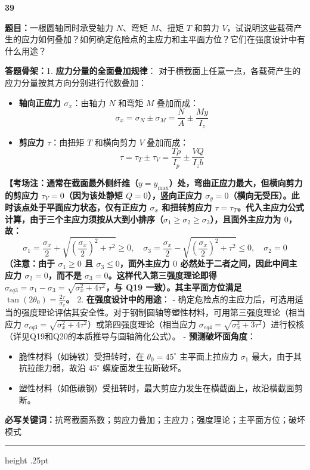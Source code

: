 \documentclass[a4paper,10pt]{article}
\newcommand{\qitem}[5]{%
\Needspace{6\baselineskip}
\vspace{3pt}
{\Large\bfseries\color{deep} #1}\quad{\bfseries\color{orangea}#2}\par
\textbf{题目：}#3\par
\textbf{答题骨架：}#4\par
\textbf{必写关键词：}{\color{bluea}#5}\par
\vspace{2pt}\hrule height .25pt
}
\newcommand{\warn}[1]{{\bfseries\color{reda}#1}}
\begin{document}
\qitem{39}{弯扭组合圆轴与多向应力叠加}
{一根圆轴同时承受轴力 \(N\)、弯矩 \(M\)、扭矩 \(T\) 和剪力 \(V\)，试说明这些载荷产生的应力如何叠加？如何确定危险点的主应力和主平面方位？它们在强度设计中有什么用途？}
{1. \textbf{应力分量的全面叠加规律}：
   对于横截面上任意一点，各载荷产生的应力分量按其方向分别进行代数叠加：
   \begin{itemize}
     \item \textbf{轴向正应力 \(\sigma_x\)}：由轴力 \(N\) 和弯矩 \(M\) 叠加而成：
           \[ \sigma_x = \sigma_N \pm \sigma_M = \frac{N}{A} \pm \frac{M y}{I_z} \]
     \item \textbf{剪应力 \(\tau\)}：由扭矩 \(T\) 和横向剪力 \(V\) 叠加而成：
           \[ \tau = \tau_T \pm \tau_V = \frac{T \rho}{I_p} \pm \frac{V Q}{I_z b} \]
   \end{itemize}
   \warn{【考场注：通常在截面最外侧纤维（\(y = y_{\max}\)）处，弯曲正应力最大，但横向剪力的剪应力 \(\tau_V = 0\)（因为该处静矩 \(Q=0\)），竖向正应力 \(\sigma_y = 0\)（横向无受压）。此时该点处于平面应力状态，仅有正应力 \(\sigma_x\) 和扭转剪应力 \(\tau = \tau_T\)。代入主应力公式计算，由于三个主应力须按从大到小排序（\(\sigma_1 \ge \sigma_2 \ge \sigma_3\)），且面外主应力为 \(0\)，故：
    \[ \sigma_1 = \frac{\sigma_x}{2} + \sqrt{\left(\frac{\sigma_x}{2}\right)^2 + \tau^2} \ge 0, \quad \sigma_3 = \frac{\sigma_x}{2} - \sqrt{\left(\frac{\sigma_x}{2}\right)^2 + \tau^2} \le 0, \quad \sigma_2 = 0 \]
    （注意：由于 \(\sigma_1 \ge 0\) 且 \(\sigma_3 \le 0\)，面外主应力 \(0\) 必然处于二者之间，因此中间主应力 \(\sigma_2 = 0\)，而不是 \(\sigma_3 = 0\)。这样代入第三强度理论即得 \(\sigma_{eq3} = \sigma_1 - \sigma_3 = \sqrt{\sigma_x^2 + 4\tau^2}\)，与 Q19 一致）。其主平面方位满足 \(\tan(2\theta_0) = \frac{2\tau}{\sigma_x}\)。}
2. \textbf{在强度设计中的用途}：
   - 确定危险点的主应力后，可选用适当的强度理论评估其安全性。对于钢制圆轴等塑性材料，可用第三强度理论（相当应力 \(\sigma_{eq3} = \sqrt{\sigma_x^2 + 4\tau^2}\)）或第四强度理论（相当应力 \(\sigma_{eq4} = \sqrt{\sigma_x^2 + 3\tau^2}\)）进行校核（详见Q19和Q20的本质推导与圆轴简化公式）。
   - \textbf{预测破坏面角度}：
     \begin{itemize}
       \item 脆性材料（如铸铁）受扭转时，在 \(\theta_0 = 45^\circ\) 主平面上拉应力 \(\sigma_1\) 最大，由于其抗拉能力弱，故沿 \(45^\circ\) 螺旋面发生拉断破坏。
       \item 塑性材料（如低碳钢）受扭转时，最大剪应力发生在横截面上，故沿横截面剪断。
     \end{itemize}}
{抗弯截面系数；剪应力叠加；主应力；强度理论；主平面方位；破坏模式}
\end{document}
